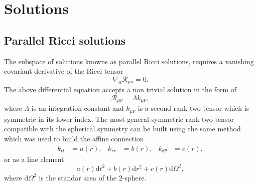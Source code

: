 \documentclass{article}
\begin{document}
\section{Solutions}
\label{sec:solutions}

\subsection{Parallel Ricci solutions}

The subspace of solutions knowns as parallel Ricci solutions, requires a vanishing covariant
derivative of the Ricci tensor
\begin{equation}
    \nabla_\alpha \mathcal{R}_{\mu\nu} = 0.
\end{equation}
The above differential equation accepts a non trivial solution in the form of
\begin{equation}
    \label{ricci_k}
    \mathcal{R}_{\mu\nu} = \Lambda k_{\mu\nu},
\end{equation}
where $\Lambda$ is an integration constant and $k_{\mu\nu}$ is a second rank two tensor which
is symmetric in its lower index. The most general symmetric rank two tensor compatible
with the spherical symmetry can be built using the same method which was used to build
the affine connection
\begin{align}
    k_{tt} & = a(r), & k_{rr} & = b(r), & k_{\theta\theta} & = c(r),
\end{align}
or as a line element
\begin{equation}
a(r)\mathrm{d}t^2 + b(r)\mathrm{d}r^2 + c(r)\mathrm{d}\Omega^2,
\end{equation}
where $\mathrm{d}\Omega^2$ is the standar area of the 2-sphere.
\end{document}
